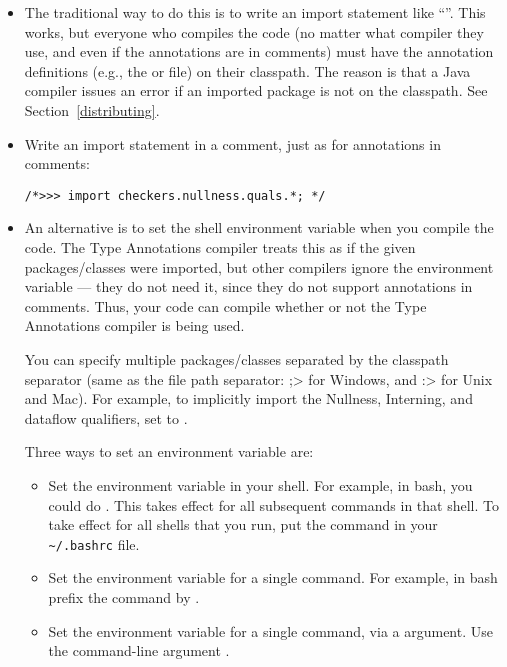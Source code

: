 \begin{itemize}
\item
The traditional way to do this is to write an import statement like
``''.  This works, but everyone who
compiles the code (no matter what compiler they use, and even if the
annotations are in comments) must have the annotation definitions (e.g.,
the  or  file) on their
classpath.  The reason is that a Java compiler issues an error if an
imported package is not on the classpath.  See Section~\ref{distributing}.

\item
Write an import statement in a comment, just as for annotations in comments:
\begin{Verbatim}
/*>>> import checkers.nullness.quals.*; */
\end{Verbatim}

\item
An alternative is to set the shell environment variable
 when you compile the code.
The Type Annotations compiler treats this as if the given packages/classes were
imported, but other compilers
ignore the
 environment variable --- they do not need it, since
they do not support annotations in comments.  Thus, your code can compile
whether or not the Type Annotations compiler is being used.

\begin{sloppypar}
You can specify multiple packages/classes separated by the classpath separator
(same as the file path separator:  \<;> for Windows, and \<:> for Unix and
Mac).  For example, to implicitly import the Nullness, Interning, and dataflow
qualifiers, set  to
.
\end{sloppypar}

Three ways to set an environment variable are:
\begin{itemize}
\item
\begin{sloppypar}
  Set the environment variable in your shell.  For example, in bash, you
  could do .
  This takes effect for all subsequent commands in that shell.  To take
  effect for all shells that you run, put the command in your
  \verb|~/.bashrc| file.
\end{sloppypar}
\item
  Set the environment variable for a single command.  For example, in bash
  prefix the  command by
  .
\item
  Set the environment variable for a single command, via a 
  argument.  Use the  command-line argument
  .
\end{itemize}


\end{itemize}
